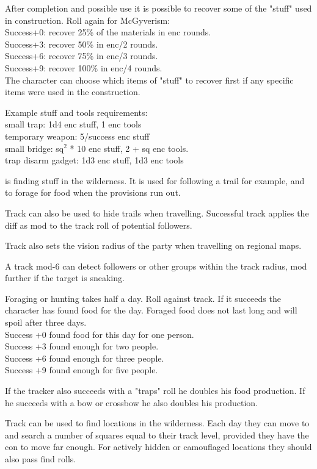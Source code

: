 After completion and possible use it is possible to recover some of the "stuff" used in construction. Roll again for McGyverism: \\
Success+0: recover 25\% of the materials in enc rounds. \\
Success+3: recover 50\% in enc/2 rounds. \\
Success+6: recover 75\% in enc/3 rounds. \\
Success+9: recover 100\% in enc/4 rounds. \\
The character can choose which items of "stuff" to recover first if any specific items were used in the construction.

Example stuff and tools requirements: \\
small trap: 1d4 enc stuff, 1 enc tools \\
temporary weapon: 5/success enc stuff \\
small bridge: sq$^2$ * 10 enc stuff, 2 + sq enc tools.\\
trap disarm gadget: 1d3 enc stuff, 1d3 enc tools


 is finding stuff in the wilderness. It is used for following a trail for example, and to forage for food when the provisions run out.

Track can also be used to hide trails when travelling. Successful track applies the diff as mod to the track roll of potential followers.

Track also sets the vision radius of the party when travelling on regional maps.

A track mod-6 can detect followers or other groups within the track radius, mod further if the target is sneaking.

Foraging or hunting takes half a day. Roll against track. If it succeeds the character has found food for the day. Foraged food does not last long and will spoil after three days. \\
Success +0 found food for this day for one person. \\
Success +3 found enough for two people. \\
Success +6 found enough for three people. \\
Success +9 found enough for five people.

If the tracker also succeeds with a "traps" roll he doubles his food production. If he succeeds with a bow or crossbow he also doubles his production.

Track can be used to find locations in the wilderness. Each day they can move to and search a number of squares equal to their track level, provided they have the con to move far enough. For actively hidden or camouflaged locations they should also pass find rolls.


